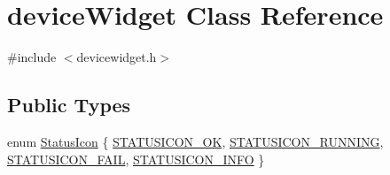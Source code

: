 \hypertarget{classdevice_widget}{\section{device\-Widget \-Class \-Reference}
\label{classdevice_widget}
}


{\ttfamily \#include $<$devicewidget.\-h$>$}

\subsection*{\-Public \-Types}
\begin{DoxyCompactItemize}
\item 
enum \hyperlink{group___y_modem_uploader_ga788236c4f7d8fe7586489a183528d657}{\-Status\-Icon} \{ \hyperlink{group___y_modem_uploader_gga788236c4f7d8fe7586489a183528d657a8bca9ffd7e0d28d471e8b3f6aa52120c}{\-S\-T\-A\-T\-U\-S\-I\-C\-O\-N\-\_\-\-O\-K}, 
\hyperlink{group___y_modem_uploader_gga788236c4f7d8fe7586489a183528d657a9930ae1923857bf1f78907ee4bb3baaa}{\-S\-T\-A\-T\-U\-S\-I\-C\-O\-N\-\_\-\-R\-U\-N\-N\-I\-N\-G}, 
\hyperlink{group___y_modem_uploader_gga788236c4f7d8fe7586489a183528d657a72975044b2bc8aa1b97b1bd730059025}{\-S\-T\-A\-T\-U\-S\-I\-C\-O\-N\-\_\-\-F\-A\-I\-L}, 
\hyperlink{group___y_modem_uploader_gga788236c4f7d8fe7586489a183528d657a7e4049feafb5e7f932619e41afda5257}{\-S\-T\-A\-T\-U\-S\-I\-C\-O\-N\-\_\-\-I\-N\-F\-O}
 \}
\end{DoxyCompactItemize}
